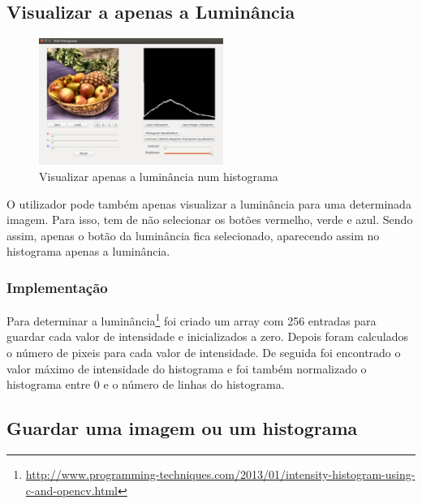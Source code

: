 \documentclass[pdftex,12pt,a4paper]{report}
\begin{document}
\subsection{Visualizar a apenas a Luminância}

\begin{figure}[!htb]
\center
 \includegraphics[width=60mm,scale=1]{imagens/only_brightness.png}
 \caption{Visualizar apenas a luminância num histograma}
\end{figure}

O utilizador pode também apenas visualizar a luminância para uma determinada imagem. Para isso, tem de não selecionar os botões vermelho, verde e azul. Sendo assim, apenas o botão da luminância fica selecionado, aparecendo assim no histograma apenas a luminância.

\subsubsection{Implementação}
Para determinar a luminância\footnote{\label{url3} \url{http://www.programming-techniques.com/2013/01/intensity-histogram-using-c-and-opencv.html}} foi criado um array com 256 entradas para guardar cada valor de intensidade e inicializados a zero. Depois foram calculados o número de pixeis para cada valor de intensidade. De seguida foi encontrado o valor máximo de intensidade do histograma e foi também normalizado o histograma entre 0 e o número de linhas do histograma.

\subsection{Guardar uma imagem ou um histograma}
\end{document}
